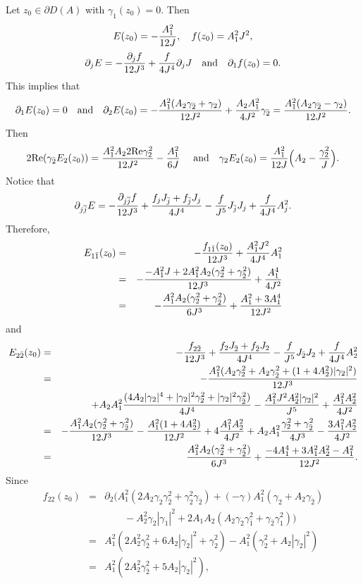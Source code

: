 \documentclass[12pt]{amsart}
\def\d{\partial}
\def\jbar{\overline{j}}
\def\d{\partial}
\begin{document}
Let $z_0\in \d D(A)$ with $\gamma_1(z_0)=0$. Then
$$
E(z_0)=-{A_1^2\over 12 J}, \quad f(z_0)=A_1^2 J^2,
$$
$$
\d_j E=-{\d_j f\over 12 J^3} +{f \over 4 J^4} \d_j J\quad \hbox{and}\quad  \d_1 f(z_0)=0.
$$
 This implies that
$$
\d_1 E(z_0)=0\quad\hbox{and}\quad  \d_2 E(z_0)=-{A_1^2 (A_2 \gamma_{\bar2}+\gamma_2)
\over 12 J^2}+{A_2 A_1^2\over 4 J^2} \gamma_{\bar2}={A_1^2 (A_2 \gamma_{\bar2}-\gamma_2)\over 12 J^2}.
$$
Then
$$
2\hbox{Re}(\gamma_{\bar2} E_2(z_0))={A_1^2 A_2 2\hbox{Re} \gamma_2^2 \over 12J^2}-{A_1^2\over 6J} \quad
\hbox{ and}\quad \gamma_2 E_2(z_0)={A_1^2\over 12 J}\Big(A_2-{\gamma_2^2 \over  J} \Big).
$$
Notice that
$$
\d_{j\jbar } E=-{\d_{j\jbar} f\over 12 J^3}+{f _j J_{\bar j}  +f_{\bar j} J_j \over 4 J^4} -{f \over J^5} J_{\bar j} J_j +{f\over 4 J^4} A_j^2.
$$
Therefore,
\begin{eqnarray*}
E_{1\bar1}(z_0)&=&-{f_{1\bar1} (z_0) \over 12 J^3}+{A_1^2 J^2\over 4J^4} A_1^2\\
&=&-{-A_1^2 J+2A_1^2A_2(\gamma_2^2+\gamma_{\bar2}^2) \over 12 J^3}+{A_1^4\over 4J^2}\\
&=& -{A_1^2 A_2(\gamma_2^2+\gamma_{\bar2}^2)\over 6 J^3}+{A_1^2 +3A_1^4\over 12 J^2}
\end{eqnarray*}
and 
\begin{eqnarray*}
E_{2\bar2}(z_0)&=&-{ f_{2\bar 2} \over 12 J^3}+{f _2 J_{\bar 2}  +f_{\bar 2} J_2 \over 4 J^4 } -{f \over J^5} J_{\bar 2} J_2+{f\over 4 J^4} A_2^2\\
&=&-{ A_1^2(A_2\gamma_2^2+A_2 \gamma_{\bar2}^2 +(1+4A_2^2) |\gamma_2|^2) \over 12 J^3}\\
&&+A_2 A_1^2 {(4A_2|\gamma_2|^4+|\gamma_2|^2\gamma_2^2 +
|\gamma_2|^2 \gamma_{\bar2}^2)  \over 4 J^4 } -{A_1^2 J^2 A_2^2 |\gamma_2|^2  \over J^5} +{A_1^2 A_2^2\over 4 J^2} \\
&=&-{ A_1^2 A_2 (\gamma_2^2+ \gamma_{\bar2}^2 ) \over 12 J^3}
-{ A_1^2 (1+4A_2^2)  \over 12 J^2}+4{A_1^2 A_2^2  \over 4 J^2 } 
 +A_2 A_1^2 {\gamma_2^2  +
 \gamma_{\bar2}^2  \over 4 J^3 } 
-{3A_1^2  A_2^2 \over 4 J^2} \\
&=&{ A_1^2 A_2 (\gamma_2^2+ \gamma_{\bar2}^2 ) \over 6 J^3}
+{ -4A_1^4 +3A_1^2A_2^2 -A_1^2  \over 12 J^2}.
\end{eqnarray*}
Since
\begin{eqnarray*}
 f_{22}(z_0)&=&\d_2 \Big(A_1^2  (2 A_2 \gamma_2 \gamma_{\bar2}^2 + \gamma_2^2 \gamma_{\bar2}) +(-\gamma) A_1^2  (\gamma_2+A_2 \gamma_{\bar2}) \\
&&\qquad -A_2^2 \gamma_2 |\gamma_1|^2
+2A_1A_2 ( A_2 \gamma_2 \gamma_{\bar1} ^2+ \gamma_{\bar2} \gamma_1^2)\Big)\\
&=&A_1^2(2A_2^2 \gamma_{\bar2}^2+6A_2|\gamma_2|^2+\gamma_2^2)- A_1^2(\gamma_2^2+A_2|\gamma_2|^2)\\
&=&A_1^2(2A_2^2 \gamma_{\bar2}^2+5A_2|\gamma_2|^2),
\end{eqnarray*}
\end{document}
